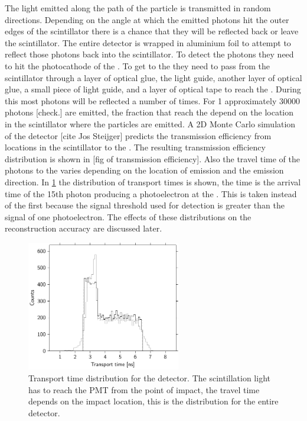 The light emitted along the path of the particle is transmitted in random directions. Depending on the angle at which the emitted photons hit the outer edges of the scintillator there is a chance that they will be reflected back or leave the scintillator. The entire detector is wrapped in aluminium foil to attempt to reflect those photons back into the scintillator. To detect the photons they need to hit the photocathode of the \pmt. To get to the \pmt they need to pass from the scintillator through a layer of optical glue, the light guide, another layer of optical glue, a small piece of light guide, and a layer of optical tape to reach the \pmt. During this most photons will be reflected a number of times. For \SI{1}{\mip} approximately 30000 photons [check.] are emitted, the fraction that reach the \pmt depend on the location in the scintillator where the particles are emitted. A 2D Monte Carlo simulation of the detector [cite Jos Steijger] predicts the transmission efficiency from locations in the scintillator to the \pmt. The resulting transmission efficiency distribution is shown in [fig of transmission efficiency]. Also the travel time of the photons to the \pmt varies depending on the location of emission and the emission direction. In \cref{fig:transport_time} the distribution of transport times is shown, the time is the arrival time of the 15th photon producing a photoelectron at the \pmt. This is taken instead of the first because the signal threshold used for detection is greater than the signal of one photoelectron. The effects of these distributions on the reconstruction accuracy are discussed later.

\begin{figure}
    \centering
    \includegraphics[width=0.6\textwidth]
                    {plots/experiment/transport_time}
    \caption{Transport time distribution for the detector. The scintillation light has to reach the PMT from the point of impact, the travel time depends on the impact location, this is the distribution for the entire detector.}
    \label{fig:transport_time}
\end{figure}


